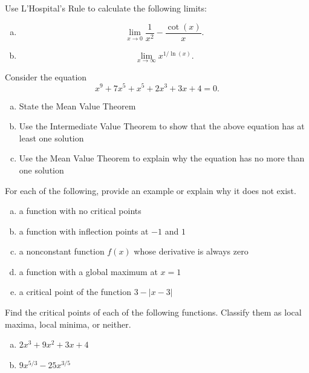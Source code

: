 \documentclass[11pt]{exam}
\theoremstyle{definition}
\begin{document}
\begin{questions}
\newpage
\question[10]

Use L'Hospital's Rule to calculate the following limits:

\begin{enumerate}[(a)]
\item
$$\lim_{x\rightarrow 0} \frac{1}{x^2}-\frac{\cot(x)}{x}.$$
\item
$$\lim_{x\rightarrow\infty}x^{1/\ln(x)}.$$
\end{enumerate}

\newpage
\question[10]\mbox{}
Consider the equation
$$x^9 + 7x^5 + x^5 + 2x^3 + 3x + 4 = 0.$$
\begin{enumerate}[(a)]
\item  State the Mean Value Theorem
\vspace{2in}
\item  Use the Intermediate Value Theorem to show that the above equation has at least one solution
\vspace{3in}
\item  Use the Mean Value Theorem to explain why the equation has no more than one solution
\end{enumerate}

\newpage
\question[10]\mbox{}
For each of the following, provide an example or explain why it does not exist.
\begin{enumerate}[(a)]
\item  a function with no critical points
\vspace{1.2in}
\item  a function with inflection points at $-1$ and $1$
\vspace{1.2in}
\item  a nonconstant function $f(x)$ whose derivative is always zero
\vspace{1.2in}
\item  a function with a global maximum at $x=1$
\vspace{1.2in}
\item  a critical point of the function $3-|x-3|$
\vspace{1.2in}
\end{enumerate}

\newpage
\question[10]\mbox{}
Find the critical points of each of the following functions.
Classify them as local maxima, local minima, or neither.
\begin{enumerate}[(a)]
\item  $2x^3+9x^2+3x+4$
\vspace{4in}
\item  $9x^{5/3}-25x^{3/5}$
\end{enumerate}

\end{questions}
\end{document}
